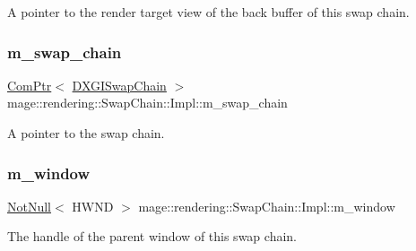 A pointer to the render target view of the back buffer of this swap chain. \mbox{\label{classmage_1_1rendering_1_1_swap_chain_1_1_impl_aced5e9cea58432f63e62f133def982c9}} 
\subsubsection{\texorpdfstring{m\+\_\+swap\+\_\+chain}{m\_swap\_chain}}
{\footnotesize\ttfamily \mbox{\hyperlink{namespacemage_ae74f374780900893caa5555d1031fd79}{Com\+Ptr}}$<$ \mbox{\hyperlink{namespacemage_1_1rendering_a739d2b0d24b44bcfb16903df756fedf6}{D\+X\+G\+I\+Swap\+Chain}} $>$ mage\+::rendering\+::\+Swap\+Chain\+::\+Impl\+::m\+\_\+swap\+\_\+chain\hspace{0.3cm}{\ttfamily [private]}}

A pointer to the swap chain. \mbox{\label{classmage_1_1rendering_1_1_swap_chain_1_1_impl_a56b2c79926ed4c86de9b0cd45e0cdabd}} 
\subsubsection{\texorpdfstring{m\+\_\+window}{m\_window}}
{\footnotesize\ttfamily \mbox{\hyperlink{namespacemage_a8769f9d670d6b585ea306cb1062af94b}{Not\+Null}}$<$ H\+W\+ND $>$ mage\+::rendering\+::\+Swap\+Chain\+::\+Impl\+::m\+\_\+window\hspace{0.3cm}{\ttfamily [private]}}

The handle of the parent window of this swap chain. 